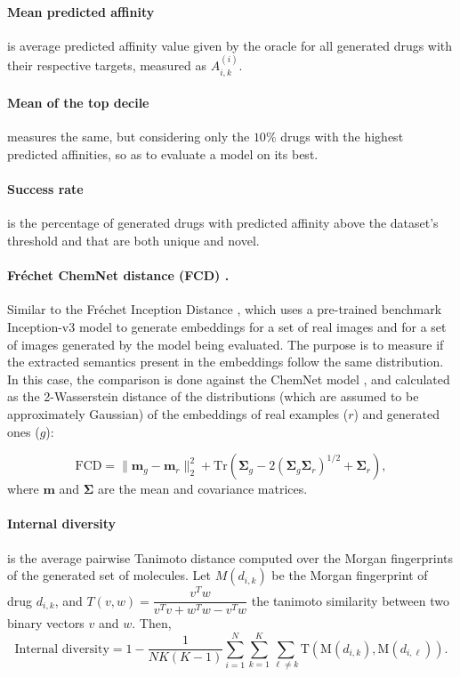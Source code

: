 \documentclass[a4paper,12pt]{article}
\begin{document}
\paragraph{Mean predicted affinity} is average predicted affinity value given by the oracle for all generated drugs with their respective targets, measured as $A_{i,k}^{(i)}$.

\paragraph{Mean of the top decile} measures the same, but considering only the $10 \%$ drugs with the highest predicted affinities, so as to evaluate a model on its best.

\paragraph{Success rate} is the percentage of generated drugs with predicted affinity above the dataset's threshold and that are both unique and novel.

\paragraph{Fréchet ChemNet distance (FCD) {\normalfont\parencite{Preuer2018FCD}}.} Similar to the Fréchet Inception Distance \parencite{Heusel2017FID}, which uses a pre-trained benchmark Inception-v3 model \parencite{Szegedy2016Inception} to generate embeddings for a set of real images and for a set of images generated by the model being evaluated. The purpose is to measure if the extracted semantics present in the embeddings follow the same distribution. In this case, the comparison is done against the ChemNet model \parencite{Goh2018ChemNet}, and calculated as the 2-Wasserstein distance of the distributions (which are assumed to be approximately Gaussian) of the embeddings of real examples ($r$) and generated ones ($g$):

\begin{equation*}\label{eq:fcd}
    \text{FCD} = \|\bm{m}_g - \bm{m}_r\|_2^2 + \text{Tr}\!\left(\bm{\Sigma}_g   - 2\left(\bm{\Sigma}_g \bm{\Sigma}_r\right)^{1/2}+ \bm{\Sigma}_r\right),
\end{equation*}
where $\bm{m}$ and $\bm{\Sigma}$ are the mean and covariance matrices.

\paragraph{Internal diversity {\normalfont\parencite{Polykovskiy2020MOSES}}} is the average pairwise Tanimoto distance computed over the Morgan fingerprints of the generated set of molecules. Let $M(d_{i, k})$ be the Morgan fingerprint of drug $d_{i, k}$, and $T(v, w) = \dfrac{v^T w}{v^Tv + w^Tw -v^Tw}$ the tanimoto similarity between two binary vectors $v$ and $w$. Then,
\begin{equation*}
    \text{Internal diversity}=1-\dfrac{1}{NK(K-1)}\sum_{i=1}^N\sum_{k=1}^K\sum_{\ell\neq k} \text{T}(\text{M}(d_{i,k}),\text{M}(d_{i,\ell})).
\end{equation*}
\end{document}
